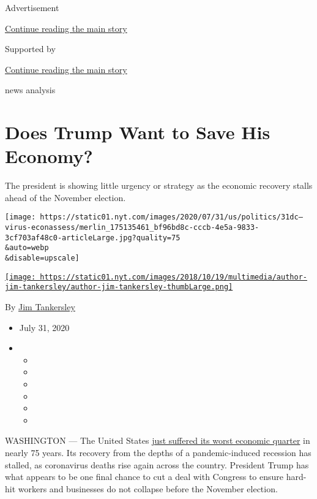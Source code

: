 Advertisement

\protect\hyperlink{after-top}{Continue reading the main story}

Supported by

\protect\hyperlink{after-sponsor}{Continue reading the main story}

news analysis

\hypertarget{does-trump-want-to-save-his-economy}{%
\section{Does Trump Want to Save His
Economy?}\label{does-trump-want-to-save-his-economy}}

The president is showing little urgency or strategy as the economic
recovery stalls ahead of the November election.

\texttt{[image: https://static01.nyt.com/images/2020/07/31/us/politics/31dc--virus-econassess/merlin\_175135461\_bf96bd8c-cccb-4e5a-9833-3cf703af48c0-articleLarge.jpg?quality=75\\\&auto=webp\\\&disable=upscale]}

\href{https://www.nytimes.com/by/jim-tankersley}{\texttt{[image: https://static01.nyt.com/images/2018/10/19/multimedia/author-jim-tankersley/author-jim-tankersley-thumbLarge.png]}}

By \href{https://www.nytimes.com/by/jim-tankersley}{Jim Tankersley}

\begin{itemize}
\item
  July 31, 2020
\item
  \begin{itemize}
  \item
  \item
  \item
  \item
  \item
  \item
  \end{itemize}
\end{itemize}

WASHINGTON --- The United States
\href{https://www.nytimes.com/2020/07/30/business/economy/q2-gdp-coronavirus-economy.html}{just
suffered its worst economic quarter} in nearly 75 years. Its recovery
from the depths of a pandemic-induced recession has stalled, as
coronavirus deaths rise again across the country. President Trump has
what appears to be one final chance to cut a deal with Congress to
ensure hard-hit workers and businesses do not collapse before the
November election.

